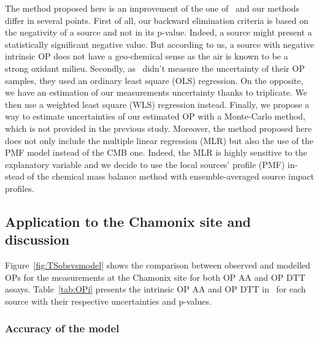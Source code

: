 \begin{otherlanguage}{english}
The method proposed here is an improvement of the one
of~\textcite{batesReactive2015} and our methods differ in several points.
First of all, our backward elimination criteria is based on the negativity of a
source and not in its p-value. Indeed, a source might present a statistically
significant negative value. But according to us, a source with negative
intrinsic OP does not have a geo-chemical sense as the air is known to be a
strong oxidant milieu.
Secondly, as~\textcite{batesReactive2015} didn’t measure the uncertainty of their
OP samples, they used an ordinary least square (OLS) regression. On the
opposite, we have an estimation of our measurements uncertainty thanks to
triplicate. We then use a weighted least square (WLS) regression instead.
Finally, we propose a way to estimate uncertainties of our estimated OP with a
Monte-Carlo method, which is not provided in the previous study.
Moreover, the method proposed here does not only include the multiple
linear regression (MLR) but also the use of the PMF model instead of the CMB
one.  Indeed, the MLR is highly sensitive to the explanatory variable and we
decide to use the local sources’ profile (PMF) instead of the chemical mass
balance method with ensemble-averaged source impact profiles.

\subsection{Application to the Chamonix site and
discussion}\label{application-to-the-chamonix-site-and-discussion}

Figure~\ref{fig:TSobsvsmodel} shows the comparison between observed and modelled
OPs for the measurements at the Chamonix site for both OP AA and OP DTT assays.
Table~\ref{tab:OPi} presents the intrinsic OP AA and OP DTT
in~\si{\opm} for each source with their respective
uncertainties and p-values.

\subsubsection{Accuracy of the model}\label{accuracy-of-the-model}


\end{otherlanguage}
